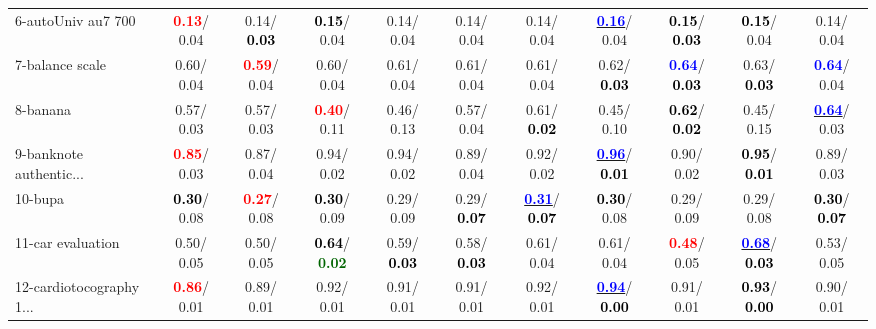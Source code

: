 \begin{table}[h]
\begin{center}
{\begin{tabular}{lc|c|c|c|c|c|c|c|c|c}
6-autoUniv au7 700 & \textcolor{red}{\textbf{  0.13}}/  0.04 &   0.14/\textcolor{black}{\textbf{  0.03}} & \textcolor{black}{\textbf{  0.15}}/  0.04 &   0.14/  0.04 &   0.14/  0.04 &   0.14/  0.04 & \underline{\textcolor{blue}{\textbf{  0.16}}}/  0.04 & \textcolor{black}{\textbf{  0.15}}/\textcolor{black}{\textbf{  0.03}} & \textcolor{black}{\textbf{  0.15}}/  0.04 &   0.14/  0.04 \\
7-balance scale &   0.60/  0.04 & \textcolor{red}{\textbf{  0.59}}/  0.04 &   0.60/  0.04 &   0.61/  0.04 &   0.61/  0.04 &   0.61/  0.04 &   0.62/\textcolor{black}{\textbf{  0.03}} & \textcolor{blue}{\textbf{  0.64}}/\textcolor{black}{\textbf{  0.03}} &   0.63/\textcolor{black}{\textbf{  0.03}} & \textcolor{blue}{\textbf{  0.64}}/  0.04 \\ \hline
8-banana &   0.57/  0.03 &   0.57/  0.03 & \textcolor{red}{\textbf{  0.40}}/  0.11 &   0.46/  0.13 &   0.57/  0.04 &   0.61/\textcolor{black}{\textbf{  0.02}} &   0.45/  0.10 & \textcolor{black}{\textbf{  0.62}}/\textcolor{black}{\textbf{  0.02}} &   0.45/  0.15 & \underline{\textcolor{blue}{\textbf{  0.64}}}/  0.03 \\
9-banknote authentic... & \textcolor{red}{\textbf{  0.85}}/  0.03 &   0.87/  0.04 &   0.94/  0.02 &   0.94/  0.02 &   0.89/  0.04 &   0.92/  0.02 & \underline{\textcolor{blue}{\textbf{  0.96}}}/\textcolor{black}{\textbf{  0.01}} &   0.90/  0.02 & \textcolor{black}{\textbf{  0.95}}/\textcolor{black}{\textbf{  0.01}} &   0.89/  0.03 \\
10-bupa & \textcolor{black}{\textbf{  0.30}}/  0.08 & \textcolor{red}{\textbf{  0.27}}/  0.08 & \textcolor{black}{\textbf{  0.30}}/  0.09 &   0.29/  0.09 &   0.29/\textcolor{black}{\textbf{  0.07}} & \underline{\textcolor{blue}{\textbf{  0.31}}}/\textcolor{black}{\textbf{  0.07}} & \textcolor{black}{\textbf{  0.30}}/  0.08 &   0.29/  0.09 &   0.29/  0.08 & \textcolor{black}{\textbf{  0.30}}/\textcolor{black}{\textbf{  0.07}} \\
11-car evaluation &   0.50/  0.05 &   0.50/  0.05 & \textcolor{black}{\textbf{  0.64}}/\textcolor{darkgreen}{\textbf{  0.02}} &   0.59/\textcolor{black}{\textbf{  0.03}} &   0.58/\textcolor{black}{\textbf{  0.03}} &   0.61/  0.04 &   0.61/  0.04 & \textcolor{red}{\textbf{  0.48}}/  0.05 & \underline{\textcolor{blue}{\textbf{  0.68}}}/\textcolor{black}{\textbf{  0.03}} &   0.53/  0.05 \\
12-cardiotocography 1... & \textcolor{red}{\textbf{  0.86}}/  0.01 &   0.89/  0.01 &   0.92/  0.01 &   0.91/  0.01 &   0.91/  0.01 &   0.92/  0.01 & \underline{\textcolor{blue}{\textbf{  0.94}}}/\textcolor{black}{\textbf{  0.00}} &   0.91/  0.01 & \textcolor{black}{\textbf{  0.93}}/\textcolor{black}{\textbf{  0.00}} &   0.90/  0.01 \\

\end{tabular}}
\end{center}
\end{table}
